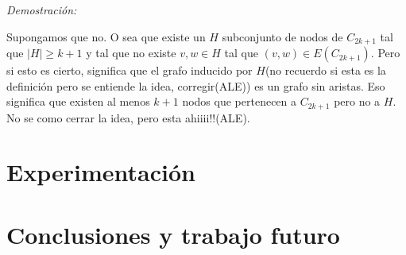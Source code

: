\documentclass[a4paper]{article}
\begin{document}
{\it Demostración:}

Supongamos que no. O sea que existe un $H$ subconjunto de nodos de $C_{2k+1}$ tal que $|H| \geq k+1$ y tal que no existe $v,w \in H$ tal que $(v,w) \in E(C_{2k+1})$. Pero si esto es cierto, significa que el grafo inducido por $H$(no recuerdo si esta es la definición pero se entiende la idea, corregir(ALE)) es un grafo sin aristas. Eso significa que existen al menos $k+1$ nodos que pertenecen a $C_{2k+1}$ pero no a $H$. No se como cerrar la idea, pero esta ahiiii!!(ALE).


\newpage

\section{Experimentación}

\newpage

\section{Conclusiones y trabajo futuro} 
\end{document}
